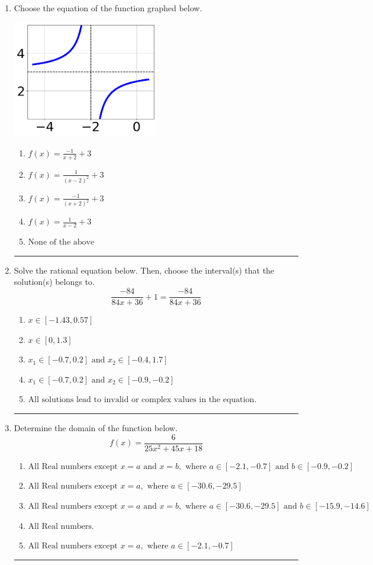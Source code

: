 \documentclass[14pt]{extbook}
\newcommand{\litem}[1]{\item#1\hspace*{-1cm}\rule{\textwidth}{0.4pt}}
\begin{document}
\begin{enumerate}
\litem{
Choose the equation of the function graphed below.
\begin{center}
    \includegraphics[width=0.5\textwidth]{../Figures/rationalGraphToEquationCopyB.png}
\end{center}
\begin{enumerate}[label=\Alph*.]
\item \( f(x) = \frac{-1}{x + 2} + 3 \)
\item \( f(x) = \frac{1}{(x - 2)^2} + 3 \)
\item \( f(x) = \frac{-1}{(x + 2)^2} + 3 \)
\item \( f(x) = \frac{1}{x - 2} + 3 \)
\item \( \text{None of the above} \)

\end{enumerate} }
\litem{
Solve the rational equation below. Then, choose the interval(s) that the solution(s) belongs to.\[ \frac{-84}{84x + 36} + 1 = \frac{-84}{84x + 36} \]\begin{enumerate}[label=\Alph*.]
\item \( x \in [-1.43,0.57] \)
\item \( x \in [0,1.3] \)
\item \( x_1 \in [-0.7, 0.2] \text{ and } x_2 \in [-0.4,1.7] \)
\item \( x_1 \in [-0.7, 0.2] \text{ and } x_2 \in [-0.9,-0.2] \)
\item \( \text{All solutions lead to invalid or complex values in the equation.} \)

\end{enumerate} }
\litem{
Determine the domain of the function below.\[ f(x) = \frac{6}{25x^{2} +45 x + 18} \]\begin{enumerate}[label=\Alph*.]
\item \( \text{All Real numbers except } x = a \text{ and } x = b, \text{ where } a \in [-2.1, -0.7] \text{ and } b \in [-0.9, -0.2] \)
\item \( \text{All Real numbers except } x = a, \text{ where } a \in [-30.6, -29.5] \)
\item \( \text{All Real numbers except } x = a \text{ and } x = b, \text{ where } a \in [-30.6, -29.5] \text{ and } b \in [-15.9, -14.6] \)
\item \( \text{All Real numbers.} \)
\item \( \text{All Real numbers except } x = a, \text{ where } a \in [-2.1, -0.7] \)


\end{enumerate}}
\end{enumerate}
\end{document}
